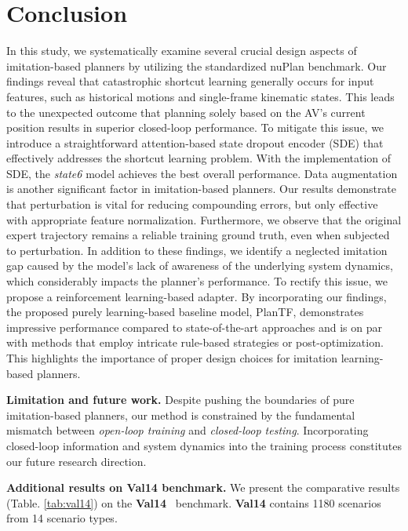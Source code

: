 \documentclass[letterpaper, 10 pt, conference]{ieeeconf}  %
\renewcommand{\paragraph}[1]{\vspace{1.25mm}\noindent\textbf{#1}}
\begin{document}
\section{Conclusion}

In this study, we systematically examine several crucial design aspects of imitation-based planners by utilizing the standardized nuPlan benchmark. Our findings reveal that catastrophic shortcut learning generally occurs for input features, such as historical motions and single-frame kinematic states. This leads to the unexpected outcome that planning solely based on the AV's current position results in superior closed-loop performance. To mitigate this issue, we introduce a straightforward attention-based state dropout encoder (SDE) that effectively addresses the shortcut learning problem. With the implementation of SDE, the \textit{state6} model achieves the best overall performance. Data augmentation is another significant factor in imitation-based planners. Our results demonstrate that perturbation is vital for reducing compounding errors, but only effective with appropriate feature normalization. Furthermore, we observe that the original expert trajectory remains a reliable training ground truth, even when subjected to perturbation. In addition to these findings, we identify a neglected imitation gap caused by the model's lack of awareness of the underlying system dynamics, which considerably impacts the planner's performance. To rectify this issue, we propose a reinforcement learning-based adapter. By incorporating our findings, the proposed purely learning-based baseline model, PlanTF, demonstrates impressive performance compared to state-of-the-art approaches and is on par with methods that employ intricate rule-based strategies or post-optimization. This highlights the importance of proper design choices for imitation learning-based planners.

\paragraph{Limitation and future work. } 
Despite pushing the boundaries of pure imitation-based planners, our method is constrained by the fundamental mismatch between \textit{open-loop training} and \textit{closed-loop testing}. Incorporating closed-loop information and system dynamics into the training process constitutes our future research direction.

\appendix

\paragraph{Additional results on Val14 benchmark.} We present the comparative results (Table. \ref{tab:val14}) on the \textbf{Val14}~\cite{Dauner2023CORL} benchmark. \textbf{Val14} contains 1180 scenarios from 14 scenario types.
\end{document}
